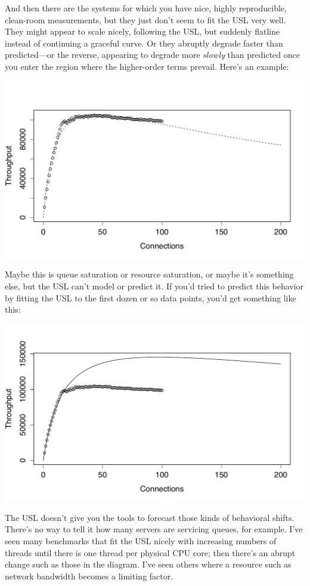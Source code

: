 \documentclass{vivid_layout}
\begin{document}
And then there are the systems for which you have nice, highly reproducible,
clean-room measurements, but they just don't seem to fit the USL very well. They
might appear to scale nicely, following the USL, but suddenly flatline instead
of continuing a graceful curve. Or they abruptly degrade faster than
predicted---or the reverse, appearing to degrade more {\itshape slowly} than
predicted once you enter the region where the higher-order terms prevail.
Here's an example:
\begin{center}
\includegraphics[width=.85\linewidth]{scalability/handlersocket}
\end{center}

Maybe this is queue saturation or resource saturation, or maybe it's something
else, but the USL can't model or predict it. If you'd tried to predict this
behavior by fitting the USL to the first dozen or so data points, you'd get
something like this:
\begin{center}
\includegraphics[width=.85\linewidth]{scalability/handlersocket-2}
\end{center}

The USL doesn't give you the tools to forecast those kinds of behavioral shifts.
There's no way to tell it how many servers are servicing queues, for
example. I've seen many benchmarks that fit the USL nicely with increasing
numbers of threads until there is one thread per physical CPU core; then there's
an abrupt change such as those in the diagram. I've seen others where a resource
such as network bandwidth becomes a limiting factor.
\end{document}
